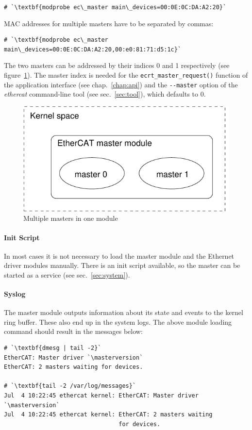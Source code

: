 \documentclass[a4paper,12pt,BCOR6mm,bibtotoc,idxtotoc]{scrbook}
\newcommand{\masterversion}{1.5.0}
\begin{document}
\begin{lstlisting}
# `\textbf{modprobe ec\_master main\_devices=00:0E:0C:DA:A2:20}`
\end{lstlisting}

MAC addresses for multiple masters have to be separated by commas:

\begin{lstlisting}
# `\textbf{modprobe ec\_master main\_devices=00:0E:0C:DA:A2:20,00:e0:81:71:d5:1c}`
\end{lstlisting}

The two masters can be addressed by their indices 0 and 1 respectively (see
figure~\ref{fig:masters}). The master index is needed for the
\lstinline+ecrt_master_request()+ function of the application interface (see
chap.~\ref{chap:api}) and the \lstinline+--master+ option of the
\textit{ethercat} command-line tool (see sec.~\ref{sec:tool}), which defaults
to $0$.

\begin{figure}[htbp]
  \centering
  \includegraphics[width=.5\textwidth]{images/masters}
  \caption{Multiple masters in one module}
  \label{fig:masters}
\end{figure}

\paragraph{Init Script}

In most cases it is not necessary to load the master module and the Ethernet
driver modules manually. There is an init script available, so the master can
be started as a service (see sec.~\ref{sec:system}).

\paragraph{Syslog}

The master module outputs information about its state and events to the kernel
ring buffer. These also end up in the system logs.  The above module loading
command should result in the messages below:

\begin{lstlisting}
# `\textbf{dmesg | tail -2}`
EtherCAT: Master driver `\masterversion`
EtherCAT: 2 masters waiting for devices.

# `\textbf{tail -2 /var/log/messages}`
Jul  4 10:22:45 ethercat kernel: EtherCAT: Master driver `\masterversion`
Jul  4 10:22:45 ethercat kernel: EtherCAT: 2 masters waiting
                                 for devices.
\end{lstlisting}
\end{document}

